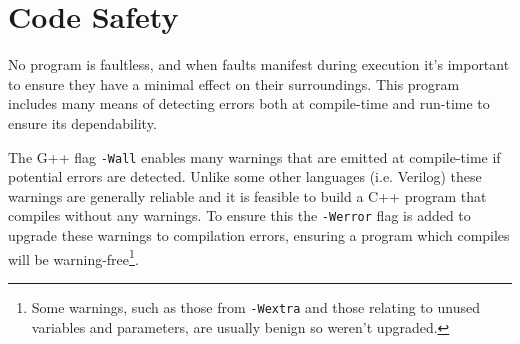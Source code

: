 \section{Code Safety}\label{sec:Impl:CodeSafety}
No program is faultless, and when faults manifest during execution it's important to ensure they have a minimal effect on their surroundings.
This program includes many means of detecting errors both at compile-time and run-time to ensure its dependability.

The G++ flag \texttt{-Wall} enables many warnings that are emitted at compile-time if potential errors are detected.
Unlike some other languages (i.e. Verilog) these warnings are generally reliable and it is feasible to build a C++ program that compiles without any warnings.
To ensure this the \texttt{-Werror} flag is added to upgrade these warnings to compilation errors, ensuring a program which compiles will be warning-free\footnote{Some warnings, such as those from \texttt{-Wextra} and those relating to unused variables and parameters, are usually benign so weren't upgraded.}.

